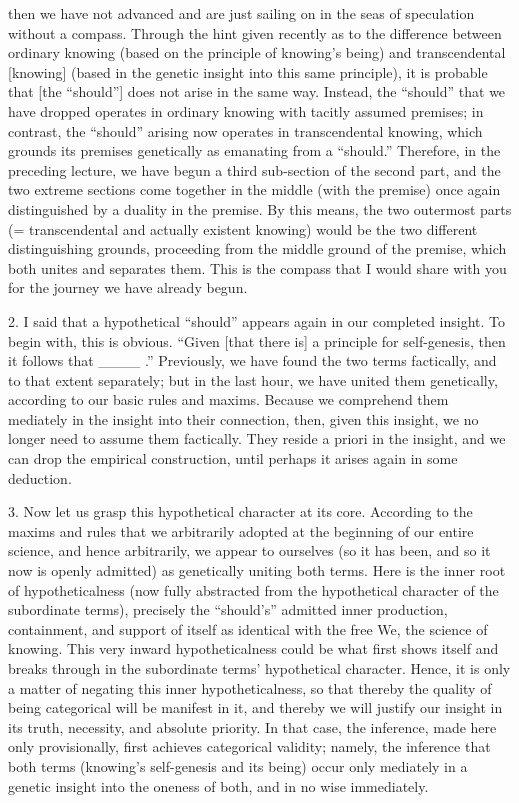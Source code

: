 then we have not advanced
and are just sailing on
in the seas of speculation without a compass.
Through the hint given recently as to
the difference between ordinary knowing
(based on the principle of knowing's being)
and transcendental [knowing]
(based in the genetic insight into this same principle),
it is probable that [the “should”] does
not arise in the same way.
Instead, the “should” that we have dropped
operates in ordinary knowing
with tacitly assumed premises;
in contrast, the “should” arising now
operates in transcendental knowing,
which grounds its premises genetically
as emanating from a “should.”
Therefore, in the preceding lecture,
we have begun a third sub-section of the second part,
and the two extreme sections come together
in the middle (with the premise) once again
distinguished by a duality in the premise.
By this means, the two outermost parts
(= transcendental and actually existent knowing)
would be the two different distinguishing grounds,
proceeding from the middle ground of the premise,
which both unites and separates them.
This is the compass that I would share with you
for the journey we have already begun.

2. I said that a hypothetical “should” appears
again in our completed insight.
To begin with, this is obvious.
“Given [that there is] a principle
for self-genesis, then it follows that ____ .”
Previously, we have found the two terms factically,
and to that extent separately;
but in the last hour, we have united them genetically,
according to our basic rules and maxims.
Because we comprehend them mediately
in the insight into their connection,
then, given this insight,
we no longer need to assume them factically.
They reside a priori in the insight,
and we can drop the empirical construction,
until perhaps it arises again in some deduction.

3. Now let us grasp this hypothetical character at its core.
According to the maxims and rules that we arbitrarily adopted
at the beginning of our entire science, and hence arbitrarily,
we appear to ourselves
(so it has been, and so it now is openly admitted)
as genetically uniting both terms.
Here is the inner root of hypotheticalness
(now fully abstracted from the hypothetical
character of the subordinate terms),
precisely the “should's” admitted
inner production, containment, and support of itself
as identical with the free We, the science of knowing.
This very inward hypotheticalness could be
what first shows itself and breaks through
in the subordinate terms' hypothetical character.
Hence, it is only a matter of
negating this inner hypotheticalness,
so that thereby the quality of being categorical
will be manifest in it,
and thereby we will justify our insight
in its truth, necessity, and absolute priority.
In that case, the inference,
made here only provisionally,
first achieves categorical validity;
namely, the inference that both terms
(knowing's self-genesis and its being)
occur only mediately in a genetic insight
into the oneness of both,
and in no wise immediately.

